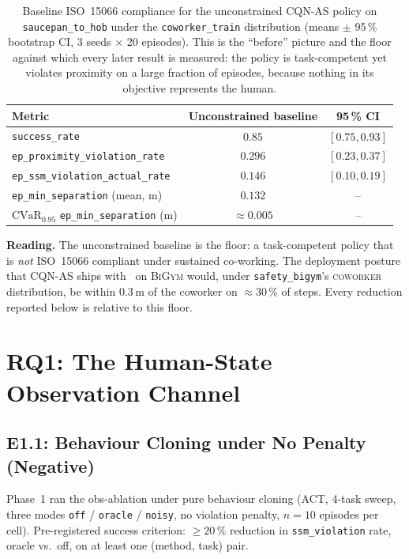\documentclass[11pt,a4paper]{report}
\newcommand{\iso}{ISO~15066}
\newcommand{\cvar}{\ensuremath{\mathrm{CVaR}}}
\newcommand{\bigym}{\textsc{BiGym}}
\newcommand{\sbigym}{\texttt{safety\_bigym}}
\newcommand{\cqnas}{CQN-AS}
\newcommand{\coworker}{\textsc{coworker}}
\begin{document}
\begin{table}[h]
\centering
\caption{Baseline \iso{} compliance for the unconstrained
\cqnas{} policy on \texttt{saucepan\_to\_hob} under the
\texttt{coworker\_train} distribution (means $\pm$ 95\,\% bootstrap
CI, 3 seeds $\times$ 20 episodes). This is the ``before'' picture and
the floor against which every later result is measured: the policy is
task-competent yet violates proximity on a large fraction of
episodes, because nothing in its objective represents the human.}
\label{tab:results:baseline}
\small
\begin{tabular}{lcc}
\toprule
Metric & Unconstrained baseline & 95\,\% CI \\
\midrule
\texttt{success\_rate}                          & $0.85$  & $[0.75, 0.93]$ \\
\texttt{ep\_proximity\_violation\_rate}         & $0.296$ & $[0.23, 0.37]$ \\
\texttt{ep\_ssm\_violation\_actual\_rate}       & $0.146$ & $[0.10, 0.19]$ \\
\texttt{ep\_min\_separation} (mean, m)          & $0.132$ & -- \\
$\cvar_{0.95}$ \texttt{ep\_min\_separation} (m) & $\approx 0.005$ & -- \\
\bottomrule
\end{tabular}
\end{table}

\textbf{Reading.} The unconstrained baseline is the floor: a
task-competent policy that is \emph{not} \iso{} compliant under
sustained co-working. The deployment posture that \cqnas{}
ships with~\cite{seo2024cqnas} on \bigym{} would, under \sbigym{}'s
\coworker{} distribution, be within $0.3$\,m of the coworker on
$\approx$30\,\% of steps. Every reduction reported below is relative to
this floor.

\section{RQ1: The Human-State Observation Channel}
\label{sec:results:obs}

\subsection{E1.1: Behaviour Cloning under No Penalty (Negative)}
\label{sec:results:obs-bc}

Phase~1 ran the obs-ablation under pure behaviour cloning (ACT,
4-task sweep, three modes \texttt{off} / \texttt{oracle} /
\texttt{noisy}, no violation penalty, $n=10$ episodes per cell).
Pre-registered success criterion: $\geq 20\,\%$ reduction in
\texttt{ssm\_violation} rate, oracle vs.\ off, on at least one
(method, task) pair.
\end{document}
